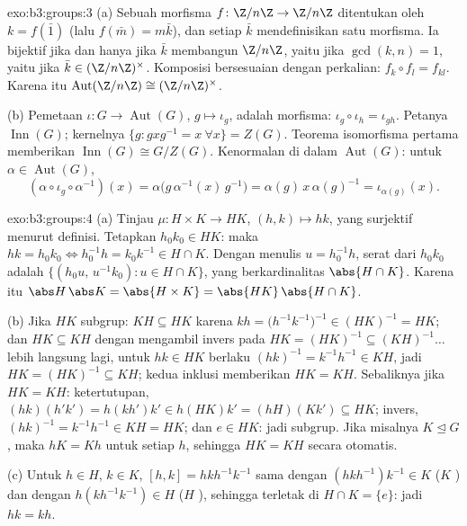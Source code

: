 \begin{solution}{exo:b3:groups:3}
(a) Sebuah morfisma $f \colon \Z/n\Z \to \Z/n\Z$ ditentukan oleh $k =
f(\bar 1)$ (lalu $f(\bar m) = m\bar k$), dan setiap $\bar k$ mendefinisikan
satu morfisma. Ia bijektif jika dan hanya jika $\bar k$ membangun $\Z/n\Z$, yaitu jika
$\gcd(k,n) = 1$, yaitu jika $\bar k \in (\Z/n\Z)^\times$. Komposisi
bersesuaian dengan perkalian: $f_k \circ f_l = f_{kl}$. Karena itu
$\operatorname{Aut}(\Z/n\Z) \cong (\Z/n\Z)^\times$.

(b) Pemetaan $\iota\colon G \to \operatorname{Aut}(G)$, $g \mapsto
\iota_g$, adalah morfisma: $\iota_g \circ \iota_h = \iota_{gh}$.
Petanya $\operatorname{Inn}(G)$; kernelnya $\{g : gxg^{-1} =
x\ \forall x\} = Z(G)$. Teorema isomorfisma pertama memberikan
$\operatorname{Inn}(G) \cong G/Z(G)$. Kenormalan di dalam
$\operatorname{Aut}(G)$: untuk $\alpha \in \operatorname{Aut}(G)$,
\[
(\alpha \circ \iota_g \circ \alpha^{-1})(x)
= \alpha\bigl(g\,\alpha^{-1}(x)\,g^{-1}\bigr)
= \alpha(g)\, x\, \alpha(g)^{-1} = \iota_{\alpha(g)}(x).
\]
\end{solution}

\begin{solution}{exo:b3:groups:4}
(a) Tinjau $\mu \colon H \times K \to HK$, $(h,k) \mapsto hk$, yang
surjektif menurut definisi. Tetapkan $h_0k_0 \in HK$: maka $hk = h_0k_0
\iff h_0^{-1}h = k_0 k^{-1} \in H \cap K$. Dengan menulis $u =
h_0^{-1}h$, serat dari $h_0k_0$ adalah $\{(h_0u,\, u^{-1}k_0) : u
\in H \cap K\}$, yang berkardinalitas $\abs{H \cap K}$. Karena itu $\abs
H\,\abs K = \abs{H\times K} = \abs{HK}\,\abs{H \cap K}$.

(b) Jika $HK$ subgrup: $KH \subseteq HK$ karena $kh =
\bigl(h^{-1}k^{-1}\bigr)^{-1} \in (HK)^{-1} = HK$; dan $HK
\subseteq KH$ dengan mengambil invers pada $HK = (HK)^{-1} \subseteq
(KH)^{-1}\dots$ lebih langsung lagi, untuk $hk \in HK$ berlaku $(hk)^{-1} =
k^{-1}h^{-1} \in KH$, jadi $HK = (HK)^{-1} \subseteq KH$; kedua
inklusi memberikan $HK = KH$. Sebaliknya jika $HK = KH$: ketertutupan,
$(hk)(h'k') = h(kh')k' \in h(HK)k' = (hH)(Kk') \subseteq HK$;
invers, $(hk)^{-1} = k^{-1}h^{-1} \in KH = HK$; dan $e \in HK$:
jadi subgrup. Jika misalnya $K \trianglelefteq G$, maka $hK = Kh$ untuk setiap
$h$, sehingga $HK = KH$ secara otomatis.

(c) Untuk $h \in H$, $k \in K$,  $[h,k] = hkh^{-1}
k^{-1}$ sama dengan $(hkh^{-1})k^{-1} \in K$ ($K$ ) dan dengan
$h(kh^{-1}k^{-1}) \in H$ ($H$ ), sehingga terletak di $H \cap K =
\{e\}$: jadi $hk = kh$.
\end{solution}

